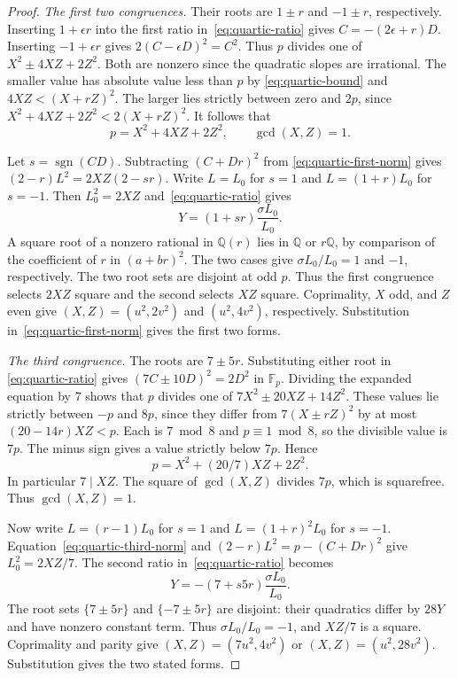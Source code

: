 \documentclass[11pt]{article}
\begin{document}
\begin{proof}
\smallskip\noindent
\emph{The first two congruences.}
Their roots are $1\pm r$ and $-1\pm r$, respectively.
Inserting $1+\epsilon r$ into the first ratio
in~\eqref{eq:quartic-ratio} gives $C=-(2\epsilon+r)D$.
Inserting $-1+\epsilon r$ gives $2(C-\epsilon D)^2=C^2$.
Thus $p$ divides one of $X^2\pm4XZ+2Z^2$.
Both are nonzero since the quadratic slopes are irrational.
The smaller value has absolute value less than $p$ by
\eqref{eq:quartic-bound} and $4XZ<(X+rZ)^2$.
The larger lies strictly between zero and $2p$, since
$X^2+4XZ+2Z^2<2(X+rZ)^2$. It follows that
\begin{equation}\label{eq:quartic-first-norm}
 p=X^2+4XZ+2Z^2,\qquad \gcd(X,Z)=1.
\end{equation}

Let $s=\operatorname{sgn}(CD)$. Subtracting $(C+Dr)^2$ from
\eqref{eq:quartic-first-norm} gives $(2-r)L^2=2XZ(2-sr)$.
Write $L=L_0$ for $s=1$ and $L=(1+r)L_0$ for $s=-1$.
Then $L_0^2=2XZ$ and~\eqref{eq:quartic-ratio} gives
\[
 Y=(1+sr)\frac{\sigma L_0}{L_0}.
\]
A square root of a nonzero rational in $\mathbb Q(r)$ lies in
$\mathbb Q$ or $r\mathbb Q$, by comparison of the coefficient of
$r$ in $(a+br)^2$. The two cases give $\sigma L_0/L_0=1$ and $-1$,
respectively. The two root sets are disjoint at odd $p$.
Thus the first congruence selects $2XZ$ square and the second
selects $XZ$ square. Coprimality, $X$ odd, and $Z$ even give
$(X,Z)=(u^2,2v^2)$ and $(u^2,4v^2)$, respectively.
Substitution in~\eqref{eq:quartic-first-norm} gives the first two forms.

\smallskip\noindent
\emph{The third congruence.}
The roots are $7\pm5r$. Substituting either root in
\eqref{eq:quartic-ratio} gives $(7C\pm10D)^2=2D^2$ in
$\mathbb F_p$. Dividing the expanded equation by $7$ shows that
$p$ divides one of $7X^2\pm20XZ+14Z^2$. These values lie
strictly between $-p$ and $8p$, since they differ from
$7(X\pm rZ)^2$ by at most $(20-14r)XZ<p$.
Each is $7\bmod8$ and $p\equiv1\bmod8$, so the divisible value is
$7p$. The minus sign gives a value strictly below $7p$. Hence
\begin{equation}\label{eq:quartic-third-norm}
 p=X^2+(20/7)XZ+2Z^2 .
\end{equation}
In particular $7\mid XZ$. The square of $\gcd(X,Z)$ divides $7p$,
which is squarefree. Thus $\gcd(X,Z)=1$.

Now write $L=(r-1)L_0$ for $s=1$ and $L=(1+r)^2L_0$ for $s=-1$.
Equation~\eqref{eq:quartic-third-norm} and
$(2-r)L^2=p-(C+Dr)^2$ give $L_0^2=2XZ/7$.
The second ratio in~\eqref{eq:quartic-ratio} becomes
\[
 Y=-(7+s5r)\frac{\sigma L_0}{L_0}.
\]
The root sets $\{7\pm5r\}$ and $\{-7\pm5r\}$ are disjoint:
their quadratics differ by $28Y$ and have nonzero constant term.
Thus $\sigma L_0/L_0=-1$, and $XZ/7$ is a square.
Coprimality and parity give $(X,Z)=(7u^2,4v^2)$ or
$(X,Z)=(u^2,28v^2)$. Substitution gives the two stated forms.


\end{proof}
\end{document}
